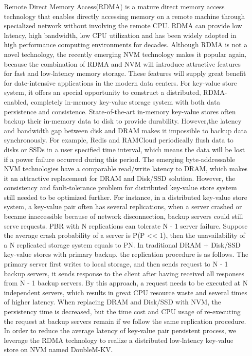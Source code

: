 \documentclass[format=acmsmall, review=false, screen=true]{acmart}
\begin{document}
	\par Remote Direct Memory Access(RDMA) is a mature direct memory access technology that enables directly accessing memory on a remote machine through specialized network without involving the remote CPU. RDMA can provide low latency, high bandwidth, low CPU utilization and has been widely adopted in high performance computing environments for decades. Although RDMA is not a novel technology, the recently emerging NVM technology makes it popular again, because the combination of RDMA and NVM will introduce attractive features for fast and low-latency memory storage. These features will supply great benefit for date-intensive applications in the modern data centers. For key-value store system, it offers an special opportunity to construct a distributed, RDMA-enabled, completely in-memory key-value storage system with both data persistence and consistence. State-of-the-art in-memory key-value stores often backup their in-memory data to disk to provide durability. However,the latency and bandwidth gap between disk and DRAM makes it impossible to backup data synchronously. For example, Redis\cite{redis} and RAMCloud\cite{rumble2014log} periodically flush data to disks or SSDs in a user specified time interval, which means the data will be lost if a power failure occurred during this period. The emerging byte-addressable NVM technologies have a comparable read/write latency to DRAM, which makes it an attractive replacement for DRAM and Disk/SSD solution. However, the consistency and fault-tolerance problem for distributed key-value store system still needed to be optimized further. For instance, in a distributed key-value store system, a key-value pair often has several replications, when a server crashed or became inaccessible because of network disconnection, backup servers could still serve requests. PBR with N replications can tolerate N - 1 server failure. Suppose the average crash probability of a server is P(P << 1), then the unavailability of a N replicated storage system equals to PN. In traditional DRAM + Disk/SSD key-value stores with primary backup, the replication procedure is as follows. The primary server first writes to local storage, and then sends request to N - 1 backup servers, it sends response to the client after having received all responses from N - 1 backup servers. By this approach, a request needs to be  executed at	N independent servers, which results in great CPU resource waste and several times of higher latency. When replacing DRAM and Disk/SSD with NVM, the persistency time is	decreased, but the time cost and CPU usage of re-executing the request at backup servers remain if we follow the same replication procedure. In order to reduce the average latency of key-value pair persistent process, we leverage the RDMA technology to realize a distributed low-latency key-value store on NVM named DoubleM-KV. 
\end{document}
